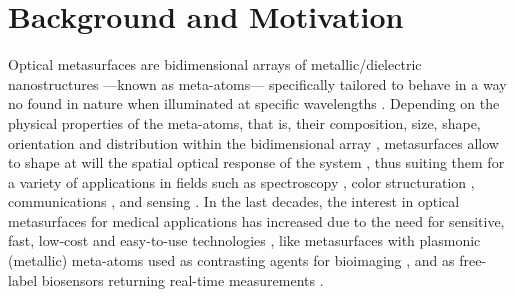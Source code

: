 
\chapter*{Background and Motivation}
\label{chapter:intro}



Optical metasurfaces are bidimensional arrays of metallic/dielectric nanostructures ---known as meta-atoms--- specifically tailored to behave in a way no found in nature when illuminated at specific wavelengths \cite{khan_optical_2022,gonzalez-alcalde_large_2020}. Depending on the physical properties of the meta-atoms, that is, their composition, size, shape, orientation and distribution within the bidimensional array \cite{kim_plasmonic_2019,khan_optical_2022}, metasurfaces allow to shape at will the  spatial optical response of the system \cite{chen_review_2016}, thus suiting them for a variety of applications in fields such as spectroscopy \cite{khan_optical_2022}, color structuration \cite{gonzalez-alcalde_large_2020}, communications \cite{chen_review_2016}, and sensing \cite{estevez_trends_2014,jain_noble_2008,khan_optical_2022,chen_review_2016,kim_plasmonic_2019}. In the last decades, the interest in optical metasurfaces for medical applications has increased due to  the need for sensitive, fast, low-cost and easy-to-use technologies \cite{estevez_trends_2014,kim_plasmonic_2019}, like metasurfaces with plasmonic (metallic) meta-atoms used as contrasting agents for bioimaging  \cite{kim_plasmonic_2019}, and as free-label biosensors returning real-time measurements \cite{estevez_trends_2014,kabashin_plasmonic_2009,khan_optical_2022}.

